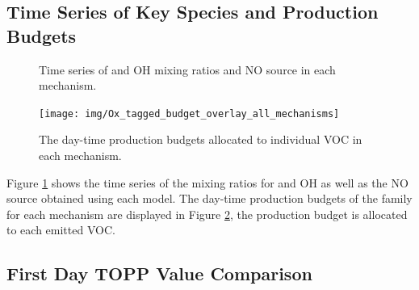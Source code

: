 
\subsection[Time Series of Key Species and Ox Production Budgets]{Time Series of Key Species and  Production Budgets}

\begin{figure}
    \centering
    \vspace{1mm}
    \caption{Time series of  and OH mixing ratios and NO source in each mechanism.}
    \vspace{-4mm}
    \label{f:time_series}
\end{figure}

\begin{figure}
    \centering
    \texttt{[image: img/Ox\_tagged\_budget\_overlay\_all\_mechanisms]}
    \vspace{1mm}
    \caption{The day-time  production budgets allocated to individual VOC in each mechanism.}
    \vspace{-4mm}
    \label{f:Ox_tagged_budgets}
\end{figure}

Figure \ref{f:time_series} shows the time series of the mixing ratios for  and OH as well as the NO source obtained using each model.
The day-time production budgets of the  family for each mechanism are displayed in Figure \ref{f:Ox_tagged_budgets}, the  production budget is allocated to each emitted VOC.

\subsection{First Day TOPP Value Comparison} \label{ss:day1} %

